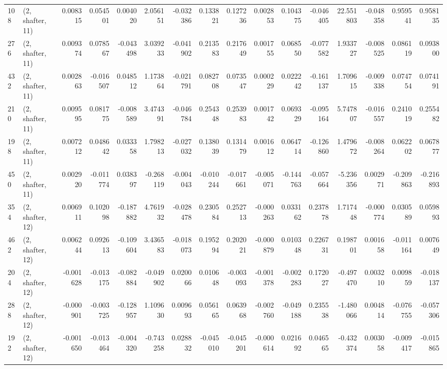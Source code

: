 \begin{tabular}{llrrrrrrrrrrrrrr}
108 &  (2, shafter, 11) &   0.008315 &  0.054501 &  0.004020 &    2.056151 & -0.032386 &   0.133821 &  0.127236 &  0.002853 &  0.104375 & -0.046405 &   22.551803 & -0.048358 &  0.959541 &  0.958135 \\
276 &  (2, shafter, 11) &   0.009374 &  0.078567 & -0.043498 &    3.039233 & -0.041902 &   0.213583 &  0.217649 &  0.001755 &  0.068550 & -0.077582 &    1.933727 & -0.008525 &  0.086119 &  0.093800 \\
432 &  (2, shafter, 11) &   0.002863 & -0.016507 &  0.048512 &    1.173864 & -0.021791 &   0.082708 &  0.073547 &  0.000229 &  0.022242 & -0.161137 &    1.709615 & -0.009338 &  0.074754 &  0.074191 \\
210 &  (2, shafter, 11) &   0.009595 &  0.081775 & -0.008589 &    3.474391 & -0.046784 &   0.254348 &  0.253983 &  0.001742 &  0.069329 & -0.095164 &    5.747807 & -0.016557 &  0.241019 &  0.255482 \\
198 &  (2, shafter, 11) &   0.007212 &  0.048642 &  0.033358 &    1.798213 & -0.027032 &   0.138039 &  0.131479 &  0.001612 &  0.064714 & -0.126860 &    1.479672 & -0.008264 &  0.062202 &  0.067877 \\
450 &  (2, shafter, 11) &   0.002920 & -0.011774 &  0.038397 &   -0.268119 & -0.004043 &  -0.010244 & -0.017661 & -0.005071 & -0.144763 & -0.057664 &   -5.236356 &  0.002971 & -0.209863 & -0.216893 \\
354 &  (2, shafter, 12) &   0.006911 &  0.102098 & -0.187882 &    4.761932 & -0.028478 &   0.230584 &  0.252713 & -0.000263 &  0.033162 &  0.237878 &    1.717448 & -0.000774 &  0.030589 &  0.059893 \\
462 &  (2, shafter, 12) &   0.006244 &  0.092613 & -0.109604 &    3.436583 & -0.018073 &   0.195294 &  0.202021 & -0.000879 &  0.010348 &  0.226731 &    0.198701 &  0.001658 & -0.011164 &  0.007649 \\
204 &  (2, shafter, 12) &  -0.001628 & -0.013175 & -0.082884 &   -0.049902 &  0.020066 &   0.010648 & -0.003093 & -0.001378 & -0.002283 &  0.172027 &   -0.497470 &  0.003210 &  0.009859 & -0.018137 \\
288 &  (2, shafter, 12) &  -0.000901 & -0.003725 & -0.128957 &    1.109630 &  0.009693 &   0.056165 &  0.063968 & -0.002760 & -0.049188 &  0.235538 &   -1.480066 &  0.004814 & -0.076755 & -0.057306 \\
192 &  (2, shafter, 12) &  -0.001650 & -0.013464 & -0.004320 &   -0.743258 &  0.028832 &  -0.045010 & -0.045201 & -0.000614 &  0.021692 &  0.046565 &   -0.432374 &  0.003058 & -0.009417 & -0.015865 \\

\end{tabular}
